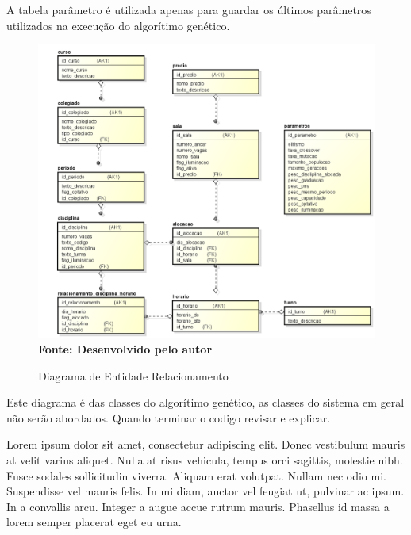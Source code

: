 \documentclass{abntpuc}
\begin{document}
A tabela parâmetro é utilizada apenas para guardar os últimos parâmetros utilizados na execução do algorítimo genético.\par

\begin{figure}[!htb]
\caption[Diagrama de Entidade Relacionamento]{Diagrama de Entidade Relacionamento}
\label{fig:figura2}
\centering
\includegraphics[scale=0.5]{imagens/diagramaEntidadeRelacionamento.png}
\\ \textbf{\footnotesize Fonte: Desenvolvido pelo autor}
\end{figure}


Este diagrama é das classes do algorítimo genético, as classes do sistema em geral não serão abordados. Quando terminar o codigo revisar e explicar.\par
Lorem ipsum dolor sit amet, consectetur adipiscing elit. Donec vestibulum mauris at velit varius aliquet. Nulla at risus vehicula, tempus orci sagittis, molestie nibh. Fusce sodales sollicitudin viverra. Aliquam erat volutpat. Nullam nec odio mi. Suspendisse vel mauris felis. In mi diam, auctor vel feugiat ut, pulvinar ac ipsum. In a convallis arcu. Integer a augue accue rutrum mauris. Phasellus id massa a lorem semper placerat eget eu urna.\par
\end{document}
